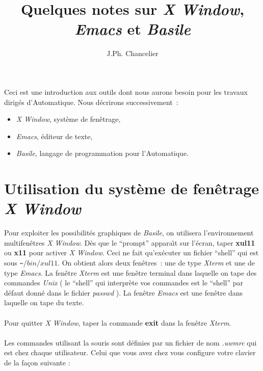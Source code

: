 \textheight=660pt 
\textwidth=470pt 
\topmargin=-27pt 
\oddsidemargin=0pt 
\evensidemargin=0pt 
\marginparwidth=60pt 
\title{Quelques notes sur {\em X Window}, {\em Emacs} et {\em Basile}}
\author{ J.Ph. Chancelier  }


\maketitle 


Ceci est une introduction aux outils dont nous aurons besoin
pour les travaux diri\-g\'es d'Au\-tomatique. Nous d\'ecrirons successivement~:
\begin{itemize}
\item {\em  X Window}, syst\`eme de fen\^etrage,
\item {\em Emacs}, \'editeur de texte,
\item {\em Basile}, langage de programmation pour l'Automatique.
\end{itemize}



\section{Utilisation du syst\`eme de fen\^etrage {\em X Window}}

Pour exploiter les possibilit\'es graphiques de {\em Basile}, 
 on utilisera l'environnement multifen\^etres {\em X Window}.
D\`es que le ``prompt'' appara\^{\i}t sur l'\'ecran, 
taper {\bf xul11} ou {\bf x11} pour activer {\em X Window}. 
Ceci ne fait qu'ex\'ecuter
un fichier ``shell'' qui est sous \verb=~=$/bin/xul11 $. On
obtient alors deux fen\^etres~: une de type {\em Xterm} et une de type
{\em Emacs}.
 La fen\^etre {\em Xterm} est une fen\^etre terminal dans
laquelle on tape des commandes {\em Unix} ( le ``shell'' qui interpr\`ete vos
commandes est le ``shell'' par d\'efaut donn\'e dans le
fichier {\em passwd} ).
 La fen\^etre {\em Emacs} est une fen\^etre dans
laquelle on tape du texte.

\paragraph{}Pour quitter {\em X Window}, taper la commande {\bf exit} 
dans la fen\^{e}tre {\em Xterm}.

\paragraph{}Les commandes utilisant la souris
sont d\'efinies par un fichier de nom {\em .uwmrc} qui est chez chaque
utilisateur.  Celui que vous avez chez vous configure votre clavier de
la fa\c{c}on suivante :

